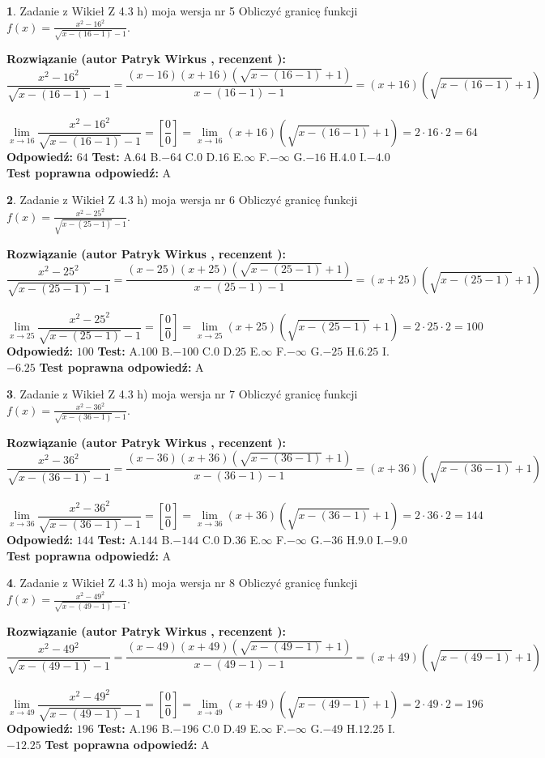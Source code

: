 \documentclass[12pt, a4paper]{article}
\theoremstyle{definition} %
\newtheorem{zad}{}
\newcommand{\zadStart}[1]{\begin{zad}#1\newline}
\newcommand{\zadStop}{\end{zad}}
\newcommand{\rozwStart}[2]{\noindent \textbf{Rozwiązanie (autor #1 , recenzent #2): }\newline}
\newcommand{\rozwStop}{\newline}
\newcommand{\odpStart}{\noindent \textbf{Odpowiedź:}\newline}
\newcommand{\odpStop}{\newline}
\newcommand{\testStart}{\noindent \textbf{Test:}\newline}
\newcommand{\testStop}{\newline}
\newcommand{\kluczStart}{\noindent \textbf{Test poprawna odpowiedź:}\newline}
\newcommand{\kluczStop}{\newline}
\begin{document}
\zadStart{Zadanie z Wikieł Z 4.3 h) moja wersja nr 5}
Obliczyć granicę funkcji $f(x)=\frac{x^{2} - 16^{2}}{\sqrt{x-(16-1)}-1}$.
\zadStop
\rozwStart{Patryk Wirkus}{}
$$\frac{x^{2} - 16^{2}}{\sqrt{x-(16-1)}-1}=\frac{(x-16)(x+16)(\sqrt{x-(16-1)}+1)}{x-(16-1)-1}=(x+16)(\sqrt{x-(16-1)}+1)$$
\\
$$\lim\limits_{x\to 16}\frac{x^{2} - 16^{2}}{\sqrt{x-(16-1)}-1}=[\frac{0}{0}]=
\lim\limits_{x\to 16}(x+16)(\sqrt{x-(16-1)}+1) = 2\cdot16 \cdot 2 = 64$$
\rozwStop
\odpStart
$64$
\odpStop
\testStart
A.$64$
B.$-64$
C.$0$
D.$16$
E.$\infty$
F.$-\infty$
G.$-16$
H.$4.0$
I.$-4.0$
\testStop
\kluczStart
A
\kluczStop



\zadStart{Zadanie z Wikieł Z 4.3 h) moja wersja nr 6}
Obliczyć granicę funkcji $f(x)=\frac{x^{2} - 25^{2}}{\sqrt{x-(25-1)}-1}$.
\zadStop
\rozwStart{Patryk Wirkus}{}
$$\frac{x^{2} - 25^{2}}{\sqrt{x-(25-1)}-1}=\frac{(x-25)(x+25)(\sqrt{x-(25-1)}+1)}{x-(25-1)-1}=(x+25)(\sqrt{x-(25-1)}+1)$$
\\
$$\lim\limits_{x\to 25}\frac{x^{2} - 25^{2}}{\sqrt{x-(25-1)}-1}=[\frac{0}{0}]=
\lim\limits_{x\to 25}(x+25)(\sqrt{x-(25-1)}+1) = 2\cdot25 \cdot 2 = 100$$
\rozwStop
\odpStart
$100$
\odpStop
\testStart
A.$100$
B.$-100$
C.$0$
D.$25$
E.$\infty$
F.$-\infty$
G.$-25$
H.$6.25$
I.$-6.25$
\testStop
\kluczStart
A
\kluczStop



\zadStart{Zadanie z Wikieł Z 4.3 h) moja wersja nr 7}
Obliczyć granicę funkcji $f(x)=\frac{x^{2} - 36^{2}}{\sqrt{x-(36-1)}-1}$.
\zadStop
\rozwStart{Patryk Wirkus}{}
$$\frac{x^{2} - 36^{2}}{\sqrt{x-(36-1)}-1}=\frac{(x-36)(x+36)(\sqrt{x-(36-1)}+1)}{x-(36-1)-1}=(x+36)(\sqrt{x-(36-1)}+1)$$
\\
$$\lim\limits_{x\to 36}\frac{x^{2} - 36^{2}}{\sqrt{x-(36-1)}-1}=[\frac{0}{0}]=
\lim\limits_{x\to 36}(x+36)(\sqrt{x-(36-1)}+1) = 2\cdot36 \cdot 2 = 144$$
\rozwStop
\odpStart
$144$
\odpStop
\testStart
A.$144$
B.$-144$
C.$0$
D.$36$
E.$\infty$
F.$-\infty$
G.$-36$
H.$9.0$
I.$-9.0$
\testStop
\kluczStart
A
\kluczStop



\zadStart{Zadanie z Wikieł Z 4.3 h) moja wersja nr 8}
Obliczyć granicę funkcji $f(x)=\frac{x^{2} - 49^{2}}{\sqrt{x-(49-1)}-1}$.
\zadStop
\rozwStart{Patryk Wirkus}{}
$$\frac{x^{2} - 49^{2}}{\sqrt{x-(49-1)}-1}=\frac{(x-49)(x+49)(\sqrt{x-(49-1)}+1)}{x-(49-1)-1}=(x+49)(\sqrt{x-(49-1)}+1)$$
\\
$$\lim\limits_{x\to 49}\frac{x^{2} - 49^{2}}{\sqrt{x-(49-1)}-1}=[\frac{0}{0}]=
\lim\limits_{x\to 49}(x+49)(\sqrt{x-(49-1)}+1) = 2\cdot49 \cdot 2 = 196$$
\rozwStop
\odpStart
$196$
\odpStop
\testStart
A.$196$
B.$-196$
C.$0$
D.$49$
E.$\infty$
F.$-\infty$
G.$-49$
H.$12.25$
I.$-12.25$
\testStop
\kluczStart
A
\kluczStop
\end{document}
